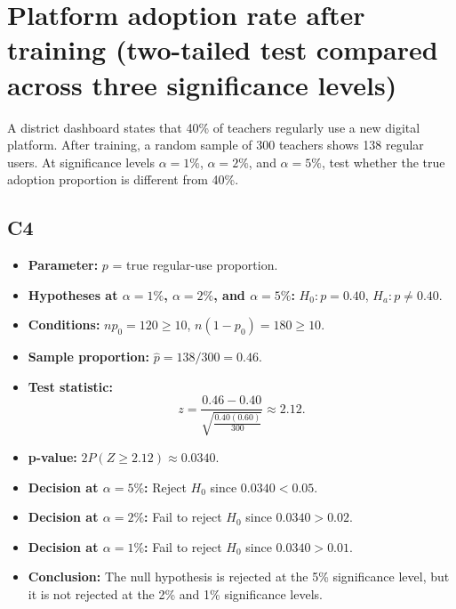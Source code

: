 
\begin{center}
\end{center}


\begin{center}
\end{center}


\section{Platform adoption rate after training (two-tailed test compared across three significance levels)}
A district dashboard states that 40\% of teachers regularly use a new digital platform. After training, a random sample of 300 teachers shows 138 regular users. At significance levels \(\alpha=1\%\), \(\alpha=2\%\), and \(\alpha=5\%\), test whether the true adoption proportion is different from 40\%.

\subsection*{C4}
\begin{itemize}
	\item \textbf{Parameter:} \(p\) = true regular-use proportion.
	\item \textbf{Hypotheses at \(\alpha=1\%\), \(\alpha=2\%\), and \(\alpha=5\%\):} \(H_0\colon p=0.40\), \(H_a\colon p\ne0.40\).
	\item \textbf{Conditions:} \(np_0=120\ge10\), \(n(1-p_0)=180\ge10\).
	\item \textbf{Sample proportion:} \(\hat p=138/300=0.46\).
	\item \textbf{Test statistic:}
	\[
	z=\frac{0.46-0.40}{\sqrt{\frac{0.40(0.60)}{300}}}\approx 2.12.
	\]
	\item \textbf{p-value:} \(2P(Z\ge 2.12)\approx 0.0340\).
	\item \textbf{Decision at \(\alpha=5\%\):} Reject \(H_0\) since \(0.0340<0.05\).
	\item \textbf{Decision at \(\alpha=2\%\):} Fail to reject \(H_0\) since \(0.0340>0.02\).
	\item \textbf{Decision at \(\alpha=1\%\):} Fail to reject \(H_0\) since \(0.0340>0.01\).
	\item \textbf{Conclusion:} The null hypothesis is rejected at the 5\% significance level, but it is not rejected at the 2\% and 1\% significance levels.
\end{itemize}

